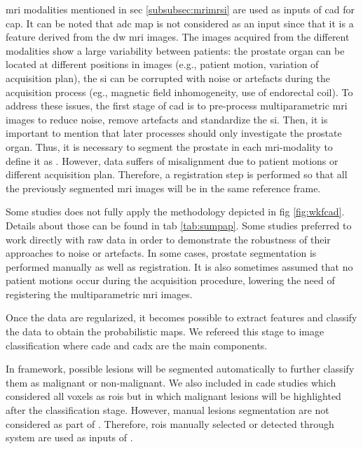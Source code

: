 \ac{mri} modalities mentioned in \acs{sec} \ref{subsubsec:mrimrsi} are used as inputs of \ac{cad} for \ac{cap}. It can be noted that \ac{adc} map is not considered as an input since that it is a feature derived from the \ac{dw} \ac{mri} images. The images acquired from the different modalities show a large variability between patients: the prostate organ can be located at different positions in images (e.g., patient motion, variation of acquisition plan), the \ac{si} can be corrupted with noise or artefacts during the acquisition process (eg., magnetic field inhomogeneity, use of endorectal coil). To address these issues, the first stage of \ac{cad} is to pre-process multiparametric \ac{mri} images to reduce noise, remove artefacts and standardize the \ac{si}. Then, it is important to mention that later processes should only investigate the prostate organ. Thus, it is necessary to segment the prostate in each \ac{mri}-modality to define it as . However, data suffers of misalignment due to patient motions or different acquisition plan. Therefore, a registration step is performed so that all the previously segmented \ac{mri} images will be in the same reference frame.

Some studies does not fully apply the methodology depicted in \acs{fig} \ref{fig:wkfcad}. Details about those can be found in \acs{tab} \ref{tab:sumpap}. Some studies preferred to work directly with raw data in order to demonstrate the robustness of their approaches to noise or artefacts. In some cases, prostate segmentation is performed manually as well as registration. It is also sometimes assumed that no patient motions occur during the acquisition procedure, lowering the need of registering the multiparametric \ac{mri} images.

Once the data are regularized, it becomes possible to extract features and classify the data to obtain the probabilistic maps. We refereed this stage to image classification where \ac{cade} and \ac{cadx} are the main components. 

In  framework, possible lesions will be segmented automatically to further classify them as malignant or non-malignant. We also included in \ac{cade} studies which considered all voxels as \acp{roi} but in which malignant lesions will be highlighted after the classification stage. However, manual lesions segmentation are not considered as part of . Therefore, \acp{roi} manually selected or detected through  system are used as inputs of .

